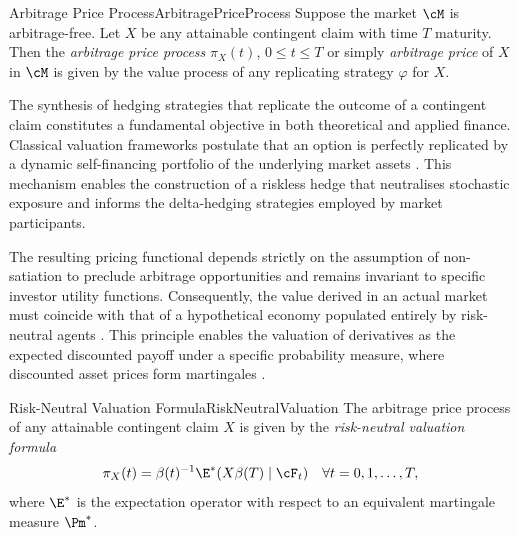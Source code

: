 \begin{defn}{Arbitrage Price Process}{ArbitragePriceProcess}
	Suppose the market \(\cM\) is arbitrage-free. Let \(X\) be any attainable contingent claim with time \(T\) maturity. Then the \textit{arbitrage price process} \(\pi_X(t)\), \(0 \leq t \leq T\) or simply \textit{arbitrage price} of \(X\) in \(\cM\) is given by the value process of any replicating strategy \(\varphi\) for \(X\).
\end{defn}

The synthesis of hedging strategies that replicate the outcome of a contingent claim constitutes a fundamental objective in both theoretical and applied finance. Classical valuation frameworks postulate that an option is perfectly replicated by a dynamic self-financing portfolio of the underlying market assets \citep{black_pricing_1973, merton_pricing_1974}. This mechanism enables the construction of a riskless hedge that neutralises stochastic exposure and informs the delta-hedging strategies employed by market participants.

The resulting pricing functional depends strictly on the assumption of non-satiation to preclude arbitrage opportunities and remains invariant to specific investor utility functions. Consequently, the value derived in an actual market must coincide with that of a hypothetical economy populated entirely by risk-neutral agents \citep{cox_valuation_1976}. This principle enables the valuation of derivatives as the expected discounted payoff under a specific probability measure, where discounted asset prices form martingales \citep{harrison_martingales_1981}.

\begin{prop}{Risk-Neutral Valuation Formula}{RiskNeutralValuation}
	The arbitrage price process of any attainable contingent claim \(X\) is given by the \textit{risk-neutral valuation formula}
	\begin{equation}
		\pi_X(t) = \beta(t)^{-1} \E^* (X \beta(T) \mid \cF_t) \quad \forall t = 0, 1, \dots, T,
		\label{eq:risk_neutral_formula}
	\end{equation}
	where \(\E^*\) is the expectation operator with respect to an equivalent martingale measure \(\Pm^*\).
\end{prop}

